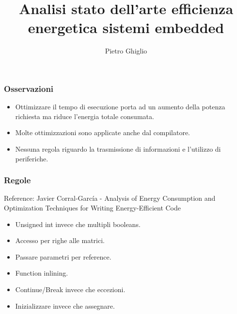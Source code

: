 \documentclass{beamer}
\title{Analisi stato dell'arte efficienza energetica sistemi embedded}
\author{Pietro Ghiglio}
\begin{document}
\titlepage

\begin{frame}
\frametitle{Osservazioni}
\begin{itemize}
\item Ottimizzare il tempo di esecuzione porta ad un aumento della potenza richiesta ma riduce l'energia totale consumata.
\item Molte ottimizzazioni sono applicate anche dal compilatore.
\item Nessuna regola riguardo la trasmissione di informazioni e l'utilizzo di periferiche.
\end{itemize}
\end{frame}

\begin{frame}
\frametitle{Regole}
Reference: Javier Corral-García - Analysis of Energy Consumption and Optimization
Techniques for Writing Energy-Efficient Code
\begin{itemize}
\item Unsigned int invece che multipli booleans.
\item Accesso per righe alle matrici.
\item Passare parametri per reference.
\item Function inlining.
\item Continue/Break invece che eccezioni.
\item Inizializzare invece che assegnare.
\end{itemize}
\end{frame}
\end{document}
